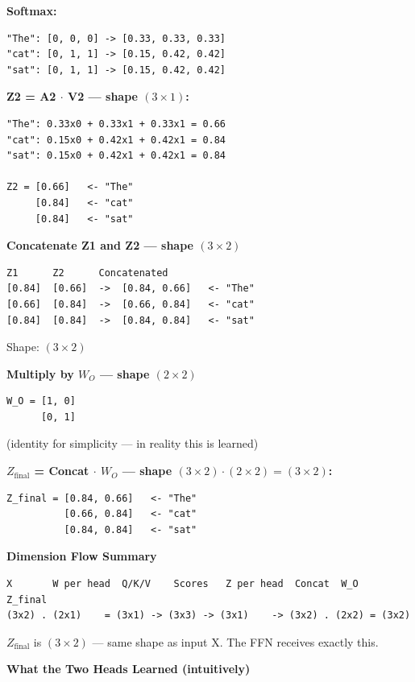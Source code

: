 \textbf{Softmax:}

\begin{verbatim}
"The": [0, 0, 0] -> [0.33, 0.33, 0.33]
"cat": [0, 1, 1] -> [0.15, 0.42, 0.42]
"sat": [0, 1, 1] -> [0.15, 0.42, 0.42]
\end{verbatim}

\textbf{Z2 = A2 $\cdot$ V2 --- shape $(3\times1)$:}

\begin{verbatim}
"The": 0.33x0 + 0.33x1 + 0.33x1 = 0.66
"cat": 0.15x0 + 0.42x1 + 0.42x1 = 0.84
"sat": 0.15x0 + 0.42x1 + 0.42x1 = 0.84

Z2 = [0.66]   <- "The"
     [0.84]   <- "cat"
     [0.84]   <- "sat"
\end{verbatim}

\medskip
\textbf{Concatenate Z1 and Z2 --- shape $(3 \times 2)$}

\begin{verbatim}
Z1      Z2      Concatenated
[0.84]  [0.66]  ->  [0.84, 0.66]   <- "The"
[0.66]  [0.84]  ->  [0.66, 0.84]   <- "cat"
[0.84]  [0.84]  ->  [0.84, 0.84]   <- "sat"
\end{verbatim}

Shape: $(3 \times 2)$ \checkmark

\medskip
\textbf{Multiply by $W_O$ --- shape $(2 \times 2)$}

\begin{verbatim}
W_O = [1, 0]
      [0, 1]
\end{verbatim}

(identity for simplicity --- in reality this is learned)

\textbf{$Z_{\mathrm{final}}$ = Concat $\cdot$ $W_O$ --- shape $(3\times2)\cdot(2\times2) = (3\times2)$:}

\begin{verbatim}
Z_final = [0.84, 0.66]   <- "The"
          [0.66, 0.84]   <- "cat"
          [0.84, 0.84]   <- "sat"
\end{verbatim}

\medskip
\textbf{Dimension Flow Summary}

\begin{verbatim}
X       W per head  Q/K/V    Scores   Z per head  Concat  W_O    Z_final
(3x2) . (2x1)    = (3x1) -> (3x3) -> (3x1)    -> (3x2) . (2x2) = (3x2)
\end{verbatim}

$Z_{\mathrm{final}}$ is $(3 \times 2)$ --- same shape as input X. The FFN receives exactly this.

\medskip
\textbf{What the Two Heads Learned (intuitively)}

